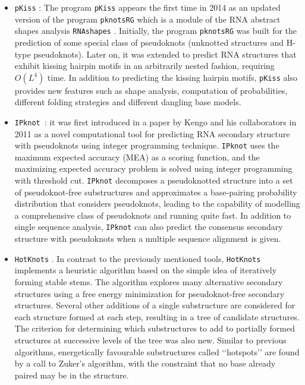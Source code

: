 \begin{itemize}
	\item \texttt{pKiss} \cite{jangie2015}: The program \texttt{pKiss} appears the first time in 2014 as an updated version of the program \texttt{pknotsRG}\cite{reeder2007pknotsrg} which is a module of the RNA abstract shapes analysis  \texttt{RNAshapes} \cite{jangie2015}. Initially, the program \texttt{pknotsRG} was built for the prediction of some special class of pseudoknots (unknotted structures and H-type pseudoknots). Later on, it was extended to predict RNA structures that exhibit kissing hairpin motifs in an arbitrarily nested fashion, requiring $O(L^4)$ time. In addition to predicting the kissing hairpin motifs, \texttt{pKiss} also provides new features such as shape analysis, computation of probabilities, different folding strategies and different dangling base models. 
	
	\item \texttt{IPknot \cite{sato2011ipknot}}: it was first introduced in a paper by Kengo and his collaborators in 2011 as a novel computational tool for predicting RNA secondary structure with pseudoknots using integer programming technique. \texttt{IPknot} uses the maximum expected accuracy (MEA) as a scoring function, and the maximizing expected accuracy problem is solved using integer programming with threshold cut. \texttt{IPknot} decomposes a pseudoknotted structure into a set of pseudoknot-free substructures and approximates a base-pairing probability distribution that considers pseudoknots, leading to the capability of modelling a comprehensive class of pseudoknots and running quite fast. In addition to single sequence analysis, \texttt{IPknot} can also predict the consensus secondary structure with pseudoknots when a multiple sequence alignment is given.
	
	\item \texttt{HotKnots} \cite{ren2005hotknots}. In contrast to the previously mentioned tools, \texttt{HotKnots} implements a heuristic algorithm based on the simple idea of iteratively forming stable stems. The algorithm explores many alternative secondary structures using a free energy minimization for pseudoknot-free secondary structures. Several other additions of a single substructure are considered for each structure formed at each step, resulting in a tree of candidate structures. The criterion for determining which substructures to add to partially formed structures at successive levels of the tree was also new. Similar to previous algorithms, energetically favourable substructures called ‘‘hotspots’’ are found by a call to Zuker’s algorithm, with the constraint that no base already paired may be in the structure. 
\end{itemize}

